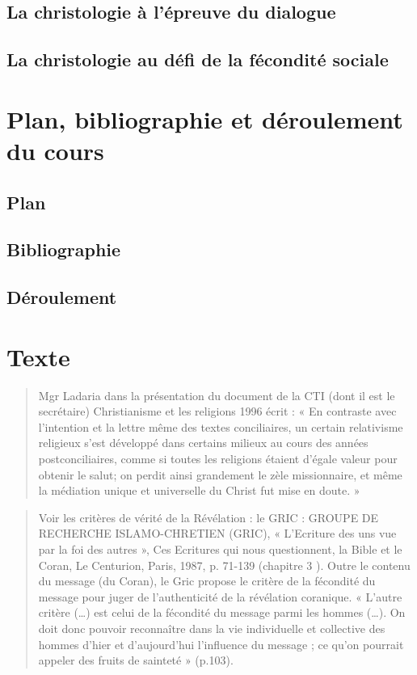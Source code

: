 \subsection{La christologie à l’épreuve du dialogue}

\subsection{La christologie au défi de la fécondité sociale} 

\section{Plan, bibliographie et déroulement du cours}
\subsection{Plan}
 
\subsection{Bibliographie}
 
\subsection{Déroulement}


 \section{Texte}








\begin{quote}
    Mgr Ladaria dans la présentation du document de la CTI (dont il est le secrétaire)
Christianisme et les religions 1996 écrit : « En contraste avec l’intention et la lettre même des
textes conciliaires, un certain relativisme religieux s’est développé dans certains milieux au
cours des années postconciliaires, comme si toutes les religions étaient d’égale valeur pour
obtenir le salut; on perdit ainsi grandement le zèle missionnaire, et même la médiation unique
et universelle du Christ fut mise en doute. »
\end{quote}


\begin{quote}
    Voir les critères de vérité de la Révélation : le GRIC : GROUPE DE RECHERCHE
ISLAMO-CHRETIEN (GRIC), « L’Ecriture des uns vue par la foi des autres », Ces Ecritures
qui nous questionnent, la Bible et le Coran, Le Centurion, Paris, 1987, p. 71-139 (chapitre 3 ).
Outre le contenu du message (du Coran), le Gric propose le critère de la fécondité du message
pour juger de l’authenticité de la révélation coranique. « L’autre critère (…) est celui de la
fécondité du message parmi les hommes (…). On doit donc pouvoir reconnaître dans la vie
individuelle et collective des hommes d’hier et d’aujourd’hui l’influence du message ; ce
qu’on pourrait appeler des fruits de sainteté » (p.103).
\end{quote}

 

